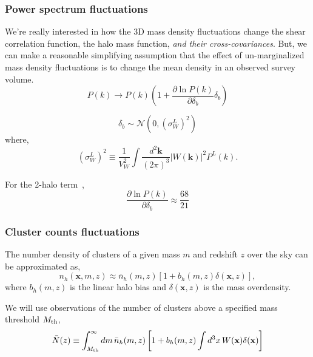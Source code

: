 \documentclass[preprint]{aastex}
\newcommand{\kv}{\mathbf{k}}
\newcommand{\xv}{\mathbf{x}}
\newcommand{\normdist}{\mathcal{N}}
\newcommand{\nbar}{\bar{n}}
\newcommand{\mth}{M_{\rm th}}
\begin{document}
\subsubsection{Power spectrum fluctuations}
We're really interested in how the 3D mass density fluctuations change the
shear correlation function, the halo mass function, \emph{and their 
cross-covariances}. But, we can make a reasonable simplifying assumption that 
the effect of un-marginalized mass density fluctuations is to change the mean density 
in an observed survey volume. 
\begin{equation}
	P(k) \rightarrow P(k) \left(
	1 + \frac{\partial \ln P(k)}{\partial \delta_b} \delta_b\right)
\end{equation}

\begin{equation}
	\delta_b \sim \normdist
	\left(0, \left(\sigma_W^L\right)^{2}\right)
\end{equation}
where,
\begin{equation}
	\left(\sigma_{W}^{L}\right)^{2} \equiv
	\frac{1}{V_{W}^{2}} 
	\int \frac{d^{2}\kv}{(2\pi)^3}
	\left|W(\kv)\right|^{2}
	P^{L}(k).
\end{equation}

For the 2-halo term~\citep[eq. 39 of][]{takada2013}, 
\begin{equation}
	\frac{\partial \ln P(k)}{\partial \delta_b} \approx 
	\frac{68}{21}
\end{equation}

\subsubsection{Cluster counts fluctuations}
The number density of clusters of a given mass $m$ and redshift $z$ over the 
sky can be approximated as,
\begin{equation}
	n_{h}(\xv, m, z) \approx \nbar_{h}(m, z)
	\left[1 + b_{h}(m,z) \delta(\xv, z)\right],
\end{equation}
where $b_{h}(m,z)$ is the linear halo bias and
$\delta(\xv,z)$ is the mass overdensity.

We will use observations of the number of clusters above a 
specified mass threshold $\mth$,
\begin{equation}
	\bar{N}(z) \equiv
	\int_{\mth}^{\infty} dm\, 
	\nbar_{h}(m,z)
	\left[
	1 + b_{h}(m,z)
	\int d^{3}x\, W(\xv) \delta(\xv)
	\right]
\end{equation}




\end{document}
